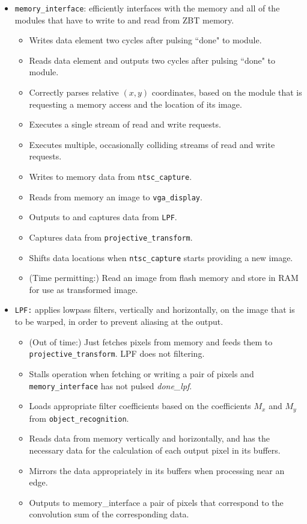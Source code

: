 \documentclass{article}
\begin{document}
\begin{itemize}
\item[] {\tt memory\_interface}: efficiently interfaces with the memory and all of the modules that have to write to and read from ZBT memory.
	\begin{itemize}
	\item Writes data element two cycles after pulsing ``done" to module.
	\item Reads data element and outputs two cycles after pulsing ``done" to module.
	\item Correctly parses relative $(x,y)$ coordinates, based on the module that is requesting a memory access and the location of its image.
	\item Executes a single stream of read and write requests.
	\item Executes multiple, occasionally colliding streams of read and write requests.
	\item Writes to memory data from {\tt ntsc\_capture}.
	\item Reads from memory an image to {\tt vga\_display}.
	\item Outputs to and captures data from {\tt LPF}.
	\item Captures data from {\tt projective\_transform}.
	\item Shifts data locations when {\tt ntsc\_capture} starts providing a new image.
	\item (Time permitting:) Read an image from flash memory and store in RAM for use as transformed image.
	\end{itemize}

\item[] {\tt LPF:} applies lowpass filters, vertically and horizontally, on the image that is to be warped, in order to prevent aliasing at the output.
	\begin{itemize}
	\item (Out of time:) Just fetches pixels from memory and feeds them to {\tt projective\_transform}. LPF does not filtering.
	\item Stalls operation when fetching or writing a pair of pixels and {\tt memory\_interface} has not pulsed {\it done\_lpf}.
	\item Loads appropriate filter coefficients based on the coefficients $M_x$ and $M_y$ from {\tt object\_recognition}.
	\item Reads data from memory vertically and horizontally, and has the necessary data for the calculation of each output pixel in its buffers.
	\item Mirrors the data appropriately in its buffers when processing near an edge.
	\item Outputs to memory\_interface a pair of pixels that correspond to the convolution sum of the corresponding data.
	\end{itemize}


\end{itemize}
\end{document}
